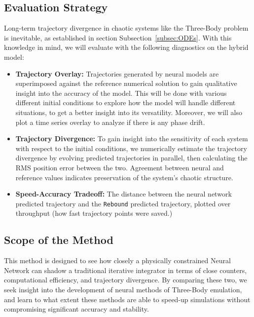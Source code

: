 \documentclass[12pt]{article}
\begin{document}
\subsection{Evaluation Strategy}
\label{sec:evaluation}
Long-term trajectory divergence in chaotic systems like the Three-Body problem is inevitable, as established in section Subsection~\ref{subsec:ODEs}. With this knowledge in mind, we will evaluate with the following diagnostics on the hybrid model:

\begin{itemize}
    \item \textbf{Trajectory Overlay:} Trajectories generated by neural models are superimposed against the reference numerical solution to gain qualitative insight into the accuracy of the model. This will be done with various different initial conditions to explore how the model will handle different situations, to get a better insight into its versatility. Moreover, we will also plot a time series overlay to analyze if there is any phase drift.
    \item \textbf{Trajectory Divergence:} To gain insight into the sensitivity of each system with respect to the initial conditions, we numerically estimate the trajectory divergence by evolving predicted trajectories in parallel, then calculating the RMS position error between the two. Agreement between neural and reference values indicates preservation of the system's chaotic structure.
    \item \textbf{Speed-Accuracy Tradeoff:} The distance between the neural network predicted trajectory and the \texttt{Rebound} predicted trajectory, plotted over throughput (how fast trajectory points were saved.)
\end{itemize}


\subsection{Scope of the Method}
This method is designed to see how closely a physically constrained Neural Network can shadow a traditional iterative integrator in terms of close counters, computational efficiency, and trajectory divergence. By comparing these two, we seek insight into the development of neural methods of Three-Body emulation, and learn to what extent these methods are able to speed-up simulations without compromising significant accuracy and stability.
\end{document}
